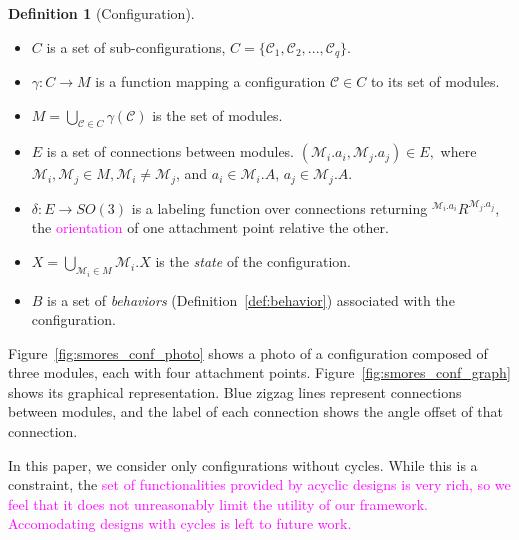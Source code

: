 \documentclass[conference]{IEEEtran}
\theoremstyle{definition}
\newtheorem{definition}{Definition}[section]
\newcommand{\abt}[1]{\textcolor{magenta}{#1}}
\begin{document}
\begin{definition}[Configuration]
\begin{itemize}
\item $C$ is a set of sub-configurations, $C=\{\mathcal{C}_{1}, \mathcal{C}_{2}, ..., \mathcal{C}_{q}\}$.
\item $\gamma: C \rightarrow M$ is a function {mapping} a configuration \( \mathcal{C}
\in C\) to its set
of modules.
\item \( M=\bigcup_{\mathcal{C}\in C}{\gamma(\mathcal{C})} \) is the set of modules.
\item $E$ is a set of connections between modules. $(\mathcal{M}_i.a_i, \mathcal{M}_j.a_j)\in E,$ where $\mathcal{M}_{i},\mathcal{M}_j \in M, \mathcal{M}_i \neq \mathcal{M}_j$, and $a_i\in \mathcal{M}_i.A$, $a_j\in \mathcal{M}_j.A$.
\item $\delta: E \rightarrow SO(3)$ is a labeling function over connections returning
\({^{\mathcal{M}_i.a_i}}R^{\mathcal{M}_j.a_j}\), the \abt{orientation} of one attachment point relative the
other. \item \(X = \displaystyle\bigcup_{\mathcal{M}_i \in M} \mathcal{M}_i.X \) is the \textit{state} of the configuration.
\item \(B\) is a set of \textit{behaviors} (Definition~\ref{def:behavior}) associated with the configuration.
\end{itemize}

Figure~\ref{fig:smores_conf_photo} shows a photo of a configuration composed
of three modules, each with four attachment points.  Figure~\ref{fig:smores_conf_graph} shows its
graphical representation. Blue zigzag lines represent connections between
modules, and the label of each connection shows the angle offset of that
connection.

In this paper, we consider only configurations without cycles. While this is a constraint,
the \abt{set of functionalities provided by acyclic designs is very rich, so we feel that
it does not unreasonably limit the utility of our framework. Accomodating designs
with cycles is left to future work.}


\end{definition}
\end{document}
